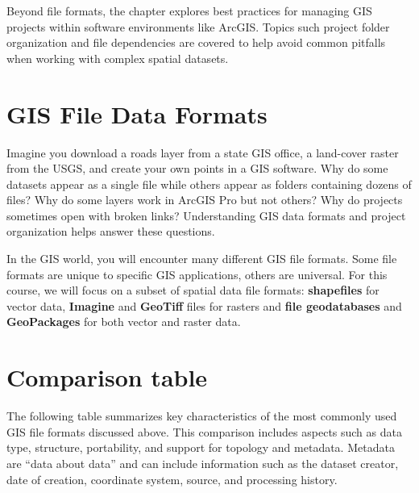 \documentclass[
  letterpaper,
]{book}
\begin{document}
Beyond file formats, the chapter explores best practices for managing
GIS projects within software environments like ArcGIS. Topics such
project folder organization and file dependencies are covered to help
avoid common pitfalls when working with complex spatial datasets.

\section{GIS File Data Formats}\label{gis-file-data-formats}

Imagine you download a roads layer from a state GIS office, a land-cover
raster from the USGS, and create your own points in a GIS software. Why
do some datasets appear as a single file while others appear as folders
containing dozens of files? Why do some layers work in ArcGIS Pro but
not others? Why do projects sometimes open with broken links?
Understanding GIS data formats and project organization helps answer
these questions.

In the GIS world, you will encounter many different GIS file formats.
Some file formats are unique to specific GIS applications, others are
universal. For this course, we will focus on a subset of spatial data
file formats: \textbf{shapefiles} for vector data, \textbf{Imagine} and
\textbf{GeoTiff} files for rasters and \textbf{file geodatabases} and
\textbf{GeoPackages} for both vector and raster data.

\section{Comparison table}\label{comparison-table}

The following table summarizes key characteristics of the most commonly
used GIS file formats discussed above. This comparison includes aspects
such as data type, structure, portability, and support for topology and
metadata. Metadata are ``data about data'' and can include information
such as the dataset creator, date of creation, coordinate system,
source, and processing history.
\end{document}
